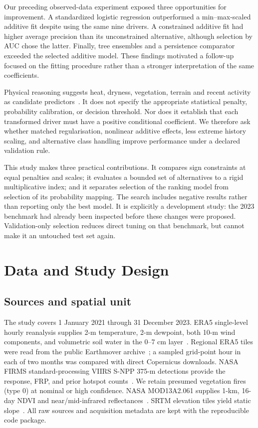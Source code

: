 \documentclass[conference]{IEEEtran}
\begin{document}
Our preceding observed-data experiment exposed three opportunities for improvement. A standardized logistic regression outperformed a min--max-scaled additive fit despite using the same nine drivers. A constrained additive fit had higher average precision than its unconstrained alternative, although selection by AUC chose the latter. Finally, tree ensembles and a persistence comparator exceeded the selected additive model. These findings motivated a follow-up focused on the fitting procedure rather than a stronger interpretation of the same coefficients.

Physical reasoning suggests heat, dryness, vegetation, terrain and recent activity as candidate predictors~\cite{jones,wooster}. It does not specify the appropriate statistical penalty, probability calibration, or decision threshold. Nor does it establish that each transformed driver must have a positive conditional coefficient. We therefore ask whether matched regularisation, nonlinear additive effects, less extreme history scaling, and alternative class handling improve performance under a declared validation rule.

This study makes three practical contributions. It compares sign constraints at equal penalties and scales; it evaluates a bounded set of alternatives to a rigid multiplicative index; and it separates selection of the ranking model from selection of its probability mapping. The search includes negative results rather than reporting only the best model. It is explicitly a development study: the 2023 benchmark had already been inspected before these changes were proposed. Validation-only selection reduces direct tuning on that benchmark, but cannot make it an untouched test set again.
\section{Data and Study Design}
\subsection{Sources and spatial unit}
The study covers 1 January 2021 through 31 December 2023. ERA5 single-level hourly reanalysis supplies 2-m temperature, 2-m dewpoint, both 10-m wind components, and volumetric soil water in the 0--7 cm layer~\cite{era5}. Regional ERA5 tiles were read from the public Earthmover archive~\cite{earthmover}; a sampled grid-point hour in each of two months was compared with direct Copernicus downloads. NASA FIRMS standard-processing VIIRS S-NPP 375-m detections provide the response, FRP, and prior hotspot counts~\cite{firms,schroeder}. We retain presumed vegetation fires (type 0) at nominal or high confidence. NASA MOD13A2.061 supplies 1-km, 16-day NDVI and near/mid-infrared reflectances~\cite{modis}. SRTM elevation tiles yield static slope~\cite{srtm}. All raw sources and acquisition metadata are kept with the reproducible code package.
\end{document}

